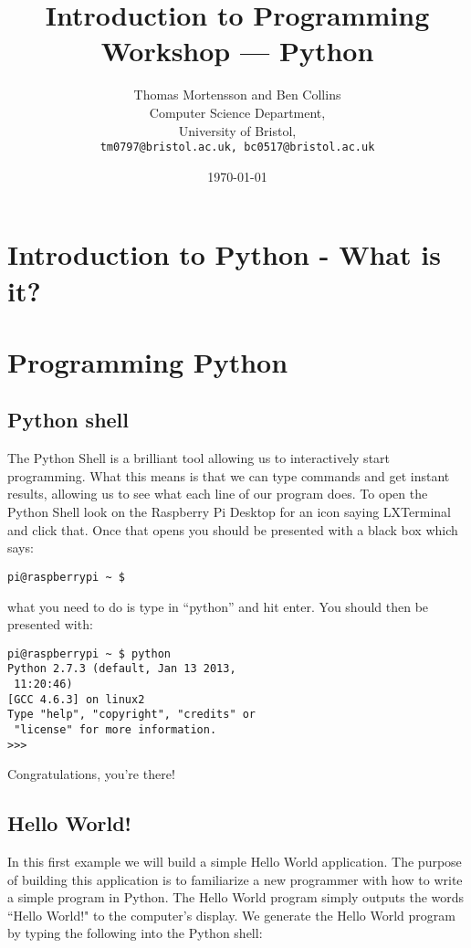 \documentclass[twocolumn]{article}
\begin{document}
\lstset{style=Style1}

\title{Introduction to Programming Workshop --- Python} 
\author{Thomas Mortensson and Ben Collins\\
        	Computer Science Department,\\
		University of Bristol,\\
		\texttt{tm0797@bristol.ac.uk, 
		bc0517@bristol.ac.uk}} 
\date{\today} 
\maketitle

\section{Introduction to Python - What is it?}

\section {Programming Python}



\subsection{Python shell}

The Python Shell is a brilliant tool allowing us to interactively start programming. What this means is that we can type commands and get instant results, allowing us to see what each line of our program does. To open the Python Shell look on the Raspberry Pi Desktop for an icon saying LXTerminal and click that. Once that opens you should be presented with a black box which says:
\begin{lstlisting}
pi@raspberrypi ~ $
\end{lstlisting}
what you need to do is type in ``python'' and hit enter. You should then be presented with:
\begin{lstlisting}
pi@raspberrypi ~ $ python
Python 2.7.3 (default, Jan 13 2013,
 11:20:46)
[GCC 4.6.3] on linux2
Type "help", "copyright", "credits" or
 "license" for more information.
>>>
\end{lstlisting}
Congratulations, you're there!


\subsection{Hello World!}

In this first example we will build a simple Hello World application. The purpose of building this application is to familiarize a new programmer with how to write a simple program in Python. The Hello World program simply outputs the words ``Hello World!" to the computer's display. We generate the Hello World program by typing the following into the Python shell:\\
\end{document}
